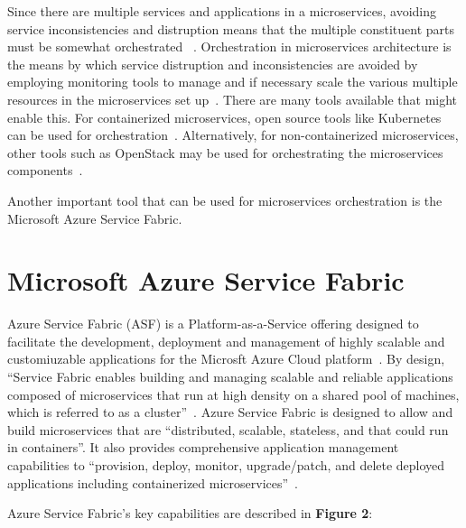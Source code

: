 Since there are multiple services and applications in a microservices, 
avoiding
service inconsistencies and distruption means that the
multiple constituent parts must be somewhat orchestrated
~\cite{hid-sp18-501-opensource}. Orchestration in microservices 
architecture is the means by which service distruption and 
inconsistencies are avoided by employing monitoring tools to
manage and if necessary scale the various multiple resources 
in the microservices set up~\cite{hid-sp18-501-opensource}. 
There are many tools available 
that might enable this. For
containerized microservices, open source tools like Kubernetes
can be
used for orchestration~\cite{hid-sp18-501-onfido}. Alternatively, for
non-containerized microservices, other tools such as OpenStack may be
used for orchestrating the microservices
components~\cite{hid-sp18-501-rackspace}.

Another important tool that can be used for microservices
orchestration is the Microsoft Azure Service Fabric.



\section{Microsoft Azure Service Fabric}
Azure Service Fabric (ASF) is a Platform-as-a-Service offering
designed to facilitate the development, deployment and management of
highly scalable and customiuzable applications for the Microsft Azure
Cloud platform~\cite{hid-sp18-501-definition}. By design, ``Service Fabric 
enables
building and managing scalable and reliable applications composed of
microservices that run at high density on a shared pool of machines,
which is referred to as a cluster''~\cite{hid-sp18-501-overview}. 
Azure Service Fabric is designed to allow and build microservices that are
``distributed, scalable, stateless, and that could run in containers''.
It also provides
comprehensive application management capabilities to ``provision,
deploy, monitor, upgrade/patch, and delete deployed applications
including containerized microservices''~\cite{hid-sp18-501-overview}.

Azure Service Fabric's key capabilities are described in {\bf Figure 2}:

